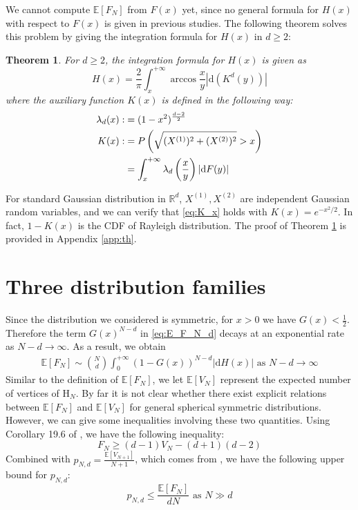 \documentclass[conference,a4paper]{IEEEtran}
\def\E{\mathbb{E}}
\def\R{\mathbb{R}}
\def\dd{\mathrm{d}}
\newtheorem{theorem}{Theorem}
\begin{document}
We cannot compute $\E[F_N]$ from $F(x)$ yet, since no general formula for $H(x)$ with respect to $F(x)$ is given in previous studies.
The following theorem solves this problem by giving the integration formula for $H(x)$ in $d\geq 2$:
\begin{theorem}\label{thm:H}
For $d\geq 2$, the integration formula for $H(x)$ is given as
\begin{equation}
     H(x) = \frac{2}{\pi}
     \int_x^{+\infty} \arccos\frac{x}{y}
     |\mathrm{d} (K^d(y))|\label{eq:H_expression_d_dim}
\end{equation}
where the auxiliary function $K(x)$ is defined in the following way:
\begin{align}
     \lambda_d(x)  :&=(1-x^2)^{\frac{d-2}{2}}
     \label{eq:lambda_r}\\
     K(x) :&=P\left(\sqrt{(X^{(1)})^2+(X^{(2)})^2}>x \right)\notag \\
     &=
     \int_x^{+\infty} 
     \lambda_d \left(\frac{x}{y} \right)|\dd F(y)|
     \label{eq:K_x}
\end{align}
\end{theorem}
For standard Gaussian distribution in $\R^d$,
$X^{(1)}, X^{(2)}$ are independent
Gaussian random variables, and we can verify that \eqref{eq:K_x} holds with $K(x) = e^{-x^2/2}$.
In fact, $1-K(x)$ is the CDF of Rayleigh distribution.
The proof of Theorem \ref{thm:H}
is provided in Appendix \ref{app:th}.
\section{Three distribution families}\label{sec:three_distriutions}
Since the distribution we considered is symmetric,
for $x>0$ we have $G(x)<\frac{1}{2}$. Therefore the
term $G(x)^{N-d}$ in \eqref{eq:E_F_N_d} decays at an exponential rate as $N-d\to \infty$.
As a result, we obtain
\begin{align}
     \E[F_N] \sim \binom{N}{d} \int_0^{+\infty} 
      (1-G(x))^{N-d} |\dd H(x)| \textrm{ as } N-d\to \infty
     \label{eq:E_F_N_d_sim}
\end{align}
Similar to the definition of $\E[F_N]$,
we let $\E[V_N]$ represent the expected number of
vertices of $\mathrm{H}_N$.
By far it is not clear whether there exist explicit relations
between $\E[F_N]$ and $\E[V_N]$
for general spherical symmetric distributions.
However, we can give some inequalities involving these two
quantities. Using Corollary 19.6 of \cite{brondsted2012introduction}, we have the following
inequality:
\begin{equation}\label{eq:F_V_upper}
     F_N \geq (d-1) V_N - (d+1)(d-2)
 \end{equation}
Combined with $p_{N,d} = \frac{\E[V_{N+1}]}{N+1}$, which comes from
\cite{efron1965convex}, we have the following upper bound for $p_{N,d}$:
\begin{equation}\label{eq:p_N_d_bound}
    p_{N,d} \leq \frac{\E[F_N]}{d N} \textrm{ as } N \gg d
\end{equation}
\end{document}
